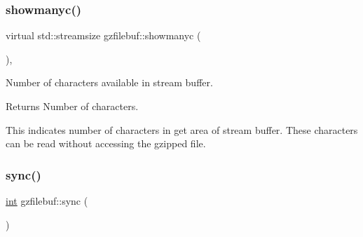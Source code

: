 \subsubsection{\texorpdfstring{showmanyc()}{showmanyc()}}
{\footnotesize\ttfamily virtual std\+::streamsize gzfilebuf\+::showmanyc (\begin{DoxyParamCaption}{ }\end{DoxyParamCaption})\hspace{0.3cm}{\ttfamily [protected]}, {\ttfamily [virtual]}}



Number of characters available in stream buffer. 

\begin{DoxyReturn}{Returns}
Number of characters.
\end{DoxyReturn}
This indicates number of characters in get area of stream buffer. These characters can be read without accessing the gzipped file. \mbox{\label{classgzfilebuf_ae537a3f86b37de7bf27d2aff0cded07e}} 
\subsubsection{\texorpdfstring{sync()}{sync()}\hspace{0.1cm}{\footnotesize\ttfamily [1/2]}}
{\footnotesize\ttfamily \mbox{\hyperlink{ioapi_8h_a787fa3cf048117ba7123753c1e74fcd6}{int}} gzfilebuf\+::sync (\begin{DoxyParamCaption}{ }\end{DoxyParamCaption})\hspace{0.3cm}{\ttfamily [virtual]}}

